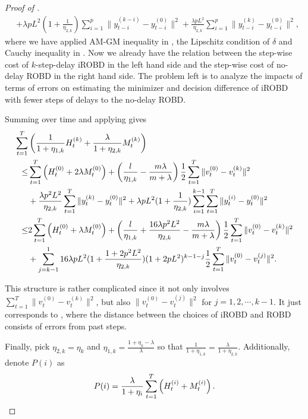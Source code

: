\begin{proof}[Proof of ]
\begin{subequations}
\begin{align}
&+\lambda pL^2(1+\frac{1}{\eta_{2,k}})\sum_{i=1}^p\|y_{t-i}^{(k-i)}-y_{t-i}^{(0)}\|^2+\frac{\lambda pL^2}{\eta_{2,k}}\sum_{i=1}^p\|y_{t-i}^{(k)}-y_{t-i}^{(0)}\|^2,\label{appendix.c.19.2}
\end{align}
\end{subequations}
where we have applied AM-GM inequality in , the Lipschitz condition of $\delta$ and Cauchy inequality in . Now we already have the relation between the step-wise cost of $k$-step-delay iROBD in the left hand side and the step-wise cost of no-delay ROBD in the right hand side. The problem left is to analyze the impacts of terms of errors on estimating the minimizer and decision difference of iROBD with fewer steps of delays to the no-delay ROBD.


Summing over time and applying  gives
\begin{align}\label{appendix.c.5}
    \sum_{t=1}^T&\left(\frac{1}{1+\eta_{1,k}}H_t^{(k)}+\frac{\lambda}{1+\eta_{2,k}}M_t^{(k)}\right)\notag\\
\le&\sum_{t=1}^T\left(H_t^{(0)}+2\lambda M_t^{(0)}\right)+\left(\frac{l}{\eta_{1,k}}-\frac{m\lambda}{m+\lambda}\right)\frac{1}{2}\sum_{t=1}^T\|v_t^{(0)}-v_t^{(k)}\|^2\notag\\
&+\frac{\lambda p^2L^2}{\eta_{2,k}}\sum_{t=1}^T\|y_t^{(k)}-y_t^{(0)}\|^2+\lambda pL^2(1+\frac{1}{\eta_{2,k}})\sum_{i=1}^{k-1}\sum_{t=1}^T\|y_t^{(i)}-y_t^{(0)}\|^2\notag\\
\le&2\sum_{t=1}^T\left(H_t^{(0)}+\lambda M_t^{(0)}\right)+\left(\frac{l}{\eta_{1,k}}+\frac{16\lambda p^2L^2}{\eta_{2,k}}-\frac{m\lambda}{m+\lambda}\right)\frac{1}{2}\sum_{t=1}^T\|v_t^{(0)}-v_t^{(k)}\|^2\notag\\
&+\sum_{j=k-1}^{1}16\lambda pL^2(1+\frac{1+2p^2L^2}{\eta_{2,k}})(1+2pL^2)^{k-1-j}\frac{1}{2}\sum_{t=1}^T\|v_t^{(0)}-v_t^{(j)}\|^2.
\end{align}

This structure is rather complicated since it not only involves $\sum_{t=1}^T\|v_t^{(0)}-v_t^{(k)}\|^2$, but also $\|v_t^{(0)}-v_t^{(j)}\|^2$ for $j=1,2,\cdots,k-1$. It just corresponds to , where the distance between the choices of iROBD and ROBD consists of errors from past steps.

Finally, pick $\eta_{2,k}=\eta_{k}$ and $\eta_{1,k}=\frac{1+\eta_{k}-\lambda}{\lambda}$ so that $\frac{1}{1+\eta_{1,k}}=\frac{\lambda}{1+\eta_{2,k}}$. Additionally, denote $P(i)$ as
\begin{align}
    P(i)=\frac{\lambda}{1+\eta_{i}}\sum_{t=1}^T\left(H_t^{(i)}+M_t^{(i)}\right).\notag
\end{align}


\end{proof}
